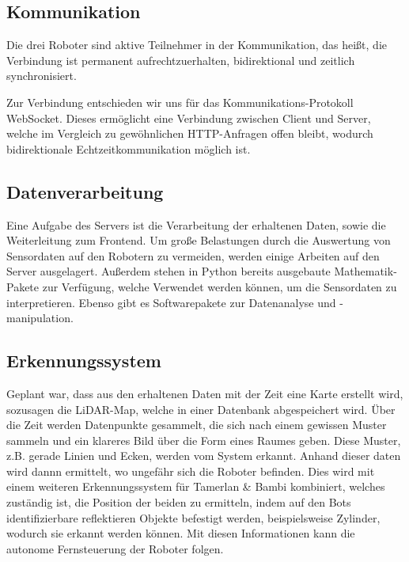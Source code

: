 \subsection{Kommunikation}
\label{subsec:Kommunikation}
Die drei Roboter sind aktive Teilnehmer in der Kommunikation, 
das heißt, die Verbindung ist permanent aufrechtzuerhalten, 
bidirektional und zeitlich synchronisiert. 

Zur Verbindung entschieden wir uns für das Kommunikations-Protokoll WebSocket.
% 
Dieses ermöglicht eine Verbindung zwischen Client und Server,
welche im Vergleich zu gewöhnlichen HTTP-Anfragen offen bleibt, 
wodurch bidirektionale Echtzeitkommunikation möglich ist.

\subsection{Datenverarbeitung}
Eine Aufgabe des Servers ist die Verarbeitung der erhaltenen Daten, 
sowie die Weiterleitung zum Frontend.
% 
Um große Belastungen durch die Auswertung von Sensordaten auf den Robotern zu vermeiden, 
werden einige Arbeiten auf den Server ausgelagert.
%
Außerdem stehen in Python bereits ausgebaute Mathematik-Pakete zur Verfügung,
welche Verwendet werden können,
um die Sensordaten zu interpretieren. 
%
Ebenso gibt es Softwarepakete zur Datenanalyse und -manipulation.

\subsection{Erkennungssystem}
Geplant war,
dass aus den erhaltenen Daten mit der Zeit eine Karte erstellt wird, 
sozusagen die LiDAR-Map, 
welche in einer Datenbank abgespeichert wird.
% 
Über die Zeit werden Datenpunkte gesammelt, 
die sich nach einem gewissen Muster sammeln 
und ein klareres Bild über die Form eines Raumes geben.
%
Diese Muster, z.B. gerade Linien und Ecken,
werden vom System erkannt.
Anhand dieser daten wird dannn ermittelt, 
wo ungefähr sich die Roboter befinden.
%
Dies wird mit einem weiteren Erkennungssystem für Tamerlan \& Bambi kombiniert, 
welches zuständig ist,
die Position der beiden zu ermitteln,
indem auf den Bots identifizierbare reflektieren Objekte befestigt werden, 
beispielsweise Zylinder, wodurch sie erkannt werden können.
%
Mit diesen Informationen kann die autonome Fernsteuerung der Roboter folgen.

